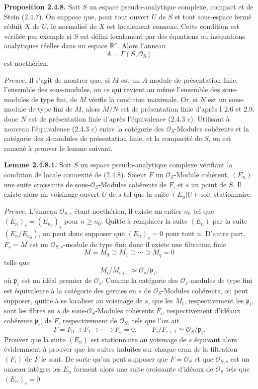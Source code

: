 \documentclass[11pt]{article}
\begin{document}
\textbf{Proposition 2.4.8.} Soit $S$ un espace pseudo-analytique complexe, compact et de Stein (2.4.7). On suppose que, pour tout ouvert $U$ de $S$ et tout sous-espace fermé réduit $X$ de $U$, le normalisé de $X$ est localement connexe. Cette condition est vérifiée par exemple si $S$ est défini localement par des équations ou inéquations analytiques réelles dans un espace $\mathbb R^n$. Alors l'anneau
\[
 A=\Gamma(S,\mathcal O_S)
\]
est noethérien.

\emph{Preuve.} Il s'agit de montrer que, si $M$ est un $A$-module de présentation finie, l'ensemble des sous-modules, ou ce qui revient au même l'ensemble des sous-modules de type fini, de $M$ vérifie la condition maximale. Or, si $N$ est un sous-module de type fini de $M$, alors $M/N$ est de présentation finie d'après I 2.6 et 2.9, donc $N$ est de présentation finie d'après l'équivalence (2.4.3 c). Utilisant à nouveau l'équivalence (2.4.3 c) entre la catégorie des $\mathcal O_S$-Modules cohérents et la catégorie des $A$-modules de présentation finie, et la compacité de $S$, on est ramené à prouver le lemme suivant.

\textbf{Lemme 2.4.8.1.} Soit $S$ un espace pseudo-analytique complexe vérifiant la condition de locale connexité de (2.4.8). Soient $F$ un $\mathcal O_S$-Module cohérent, $(E_n)$ une suite croissante de sous-$\mathcal O_S$-Modules cohérents de $F$, et $s$ un point de $S$. Il existe alors un voisinage ouvert $U$ de $s$ tel que la suite $(E_n|U)$ soit stationnaire.

\emph{Preuve.} L'anneau $\mathcal O_{S,s}$ étant noethérien, il existe un entier $n_0$ tel que $(E_n)_s=(E_{n_0})_s$ pour $n\geq n_0$. Quitte à remplacer la suite $(E_n)$ par la suite $(E_n/E_{n_0})$, on peut donc supposer que $(E_n)_s=0$ pour tout $n$. D'autre part, $F_s=M$ est un $\mathcal O_{S,s}$-module de type fini; donc il existe une filtration finie
\[
 M=M_0\supset M_1\supset\cdots\supset M_q=0
\]
telle que
\[
 M_i/M_{i+1}\simeq \mathcal O_s/\mathfrak p_i,
\]
où $\mathfrak p_i$ est un idéal premier de $\mathcal O_s$. Comme la catégorie des $\mathcal O_s$-modules de type fini est équivalente à la catégorie des germes en $s$ de $\mathcal O_S$-Modules cohérents, on peut supposer, quitte à se localiser au voisinage de $s$, que les $M_i$, respectivement les $\mathfrak p_i$, sont les fibres en $s$ de sous-$\mathcal O_S$-Modules cohérents $F_i$, respectivement d'idéaux cohérents $\mathfrak p_i$, de $F$, respectivement de $\mathcal O_S$, tels que l'on ait
\[
 F=F_0\supset F_1\supset\cdots\supset F_q=0,
 \qquad F_i/F_{i+1}\simeq\mathcal O_S/\mathfrak p_i.
\]
Prouver que la suite $(E_n)$ est stationnaire au voisinage de $s$ équivaut alors évidemment à prouver que les suites induites sur chaque cran de la filtration $(F_i)$ de $F$ le sont. De sorte qu'on peut supposer que $F=\mathcal O_S$ et que $\mathcal O_{S,s}$ est un anneau intègre; les $E_n$ forment alors une suite croissante d'idéaux de $\mathcal O_S$ tels que $(E_n)_s=0$.
\end{document}
